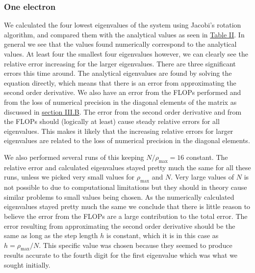 \documentclass[reprint,english,notitlepage]{revtex4-1}  %
\begin{document}
\subsubsection{One electron} \label{sec:V:b:i}

We calculated the four lowest eigenvalues of the system using Jacobi's rotation algorithm, and compared them with the analytical values as seen in \hyperref[table:IV:b:1]{Table II}. In general we see that the values found numerically correspond to the analytical values. At least four the smallest four eigenvalues however, we can clearly see the relative error increasing for the larger eigenvalues. There are three significant errors this time around. The analytical eigenvalues are found by solving the equation directly, which means that there is an error from approximating the second order derivative. We also have an error from the FLOPs performed and from the loss of numerical precision in the diagonal elements of the matrix as discussed in \hyperref[sec:III:b]{section III.B}. The error from the second order derivative and from the FLOPs should (logically at least) cause steady relative errors for all eigenvalues. This makes it likely that the increasing relative errors for larger eigenvalues are related to the loss of numerical precision in the diagonal elements.

We also performed several runs of this keeping $N/\rho_\text{max} = 16$ constant. The relative error and calculated eigenvalues stayed pretty much the same for all these runs, unless we picked very small values for $\rho_\text{max}$ and $N$. Very large values of $N$ is not possible to due to computational limitations but they should in theory cause similar problems to small values being chosen. As the numerically calculated eigenvalues stayed pretty much the same we conclude that there is little reason to believe the error from the FLOPs are a large contribution to the total error. The error resulting from approximating the second order derivative should be the same as long as the step length $h$ is constant, which it is in this case as $h = \rho_\text{max}/N$. This specific value was chosen because they seemed to produce results accurate to the fourth digit for the first eigenvalue which was what we sought initially.
\end{document}
